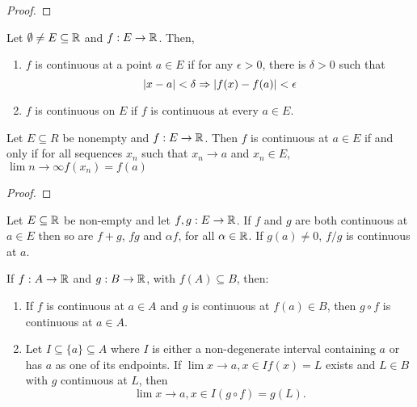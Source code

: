 \begin{proof}
\end{proof}

\begin{definition}
  Let \(\emptyset \neq E \subseteq \mathbb{R}\) and \(f : E \to \mathbb{R}\). Then,
  \begin{enumerate}
  \item \(f\) is continuous at a point \(a \in E\) if for any \(\epsilon > 0\), there is \(\delta > 0\) such that
    \[\abs{x - a} < \delta \Rightarrow \abs{f(x) - f(a)} < \epsilon\]

  \item \(f\) is continuous on \(E\) if \(f\) is continuous at every \(a \in E\).
  \end{enumerate}
\end{definition}

\begin{theorem}
  Let \(E \subseteq R\) be nonempty and \(f : E \to \mathbb{R}\). Then \(f\) is continuous at \(a \in E\) if and only if for all sequences \(x_{n}\) such that \(x_{n} \to a\) and \(x_{n} \in E\), \(\lim{n \to \infty}{f(x_{n})} = f(a)\)
\end{theorem}

\begin{proof}
\end{proof}

\begin{theorem}
  Let \(E \subseteq \mathbb{R}\) be non-empty and let \(f, g : E \to \mathbb{R}\). If \(f\) and \(g\) are both continuous at \(a \in E\) then so are \(f + g\), \(fg\) and \(\alpha f\), for all \(\alpha \in \mathbb{R}\). If \(g(a) \neq 0\), \(f/g\) is continuous at \(a\).

  If \(f : A \to \mathbb{R}\) and \(g : B \to \mathbb{R}\), with \(f(A) \subseteq B\), then:
  \begin{enumerate}
    \item If \(f\) is continuous at \(a \in A\) and \(g\) is continuous at \(f(a) \in B\), then \(g \circ f\) is continuous at \(a \in A\).

    \item Let \(I \subseteq \{a\} \subseteq A\) where \(I\) is either a non-degenerate interval containing \(a\) or has \(a\) as one of its endpoints. If \(\lim{x \to a, x \in I}{f(x)} = L\) exists and \(L \in B\) with \(g\) continuous at \(L\), then
      \[\lim{x \to a, x \in I}(g \circ f) = g(L).\]
  \end{enumerate}
\end{theorem}


